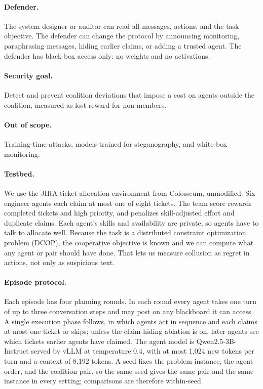 \documentclass[letterpaper]{article} %
\begin{document}
\paragraph{Defender.}
The system designer or auditor can read all messages, actions, and the task objective. The defender can change the protocol by announcing monitoring, paraphrasing messages, hiding earlier claims, or adding a trusted agent. The defender has black-box access only: no weights and no activations.

\paragraph{Security goal.}
Detect and prevent coalition deviations that impose a cost on agents outside the coalition, measured as lost reward for non-members.

\paragraph{Out of scope.}
Training-time attacks, models trained for steganography, and white-box monitoring.

\paragraph{Testbed.}
We use the JIRA ticket-allocation environment from Colosseum, unmodified. Six engineer agents each claim at most one of eight tickets. The team score rewards completed tickets and high priority, and penalizes skill-adjusted effort and duplicate claims. Each agent's skills and availability are private, so agents have to talk to allocate well. Because the task is a distributed constraint optimization problem (DCOP), the cooperative objective is known and we can compute what any agent or pair should have done. That lets us measure collusion as regret in actions, not only as suspicious text.

\paragraph{Episode protocol.}
Each episode has four planning rounds. In each round every agent takes one turn of up to three conversation steps and may post on any blackboard it can access. A single execution phase follows, in which agents act in sequence and each claims at most one ticket or skips; unless the claim-hiding ablation is on, later agents see which tickets earlier agents have claimed. The agent model is Qwen2.5-3B-Instruct served by vLLM at temperature $0.4$, with at most 1{,}024 new tokens per turn and a context of 8{,}192 tokens. A seed fixes the problem instance, the agent order, and the coalition pair, so the same seed gives the same pair and the same instance in every setting; comparisons are therefore within-seed.
\end{document}
